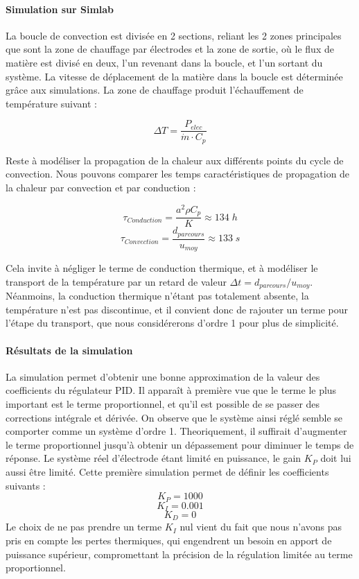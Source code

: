 \documentclass[12pt, a4paper, french, BCOR = 0pt, DIV = 10]{scrartcl}
\begin{document}
     \paragraph{Simulation sur Simlab}
     La boucle de convection est divisée en 2 sections, reliant les 2 zones principales que sont la zone de chauffage par électrodes et la zone de sortie, où le flux de matière est divisé en deux, l'un revenant dans la boucle, et l'un sortant du système. La vitesse de déplacement de la matière dans la boucle est déterminée grâce aux simulations. La zone de chauffage produit l'échauffement de température suivant :
     
     $$\Delta T = \frac{P_{elec}}{\dot{m}\cdot C_p}$$
     
     Reste à modéliser la propagation de la chaleur aux différents points du cycle de convection. Nous pouvons comparer les temps caractéristiques de propagation de la chaleur par convection et par conduction :

     $$\tau_{Conduction} = \frac{a^2\rho C_p}{K} \approx 134 \; h$$
     $$\tau_{Convection} = \frac{d_{parcours}}{u_{moy}} \approx 133 \; s$$

     Cela invite à négliger le terme de conduction thermique, et à modéliser le transport de la température par un retard de valeur $\Delta t=d_{parcours}/u_{moy}$. Néanmoins, la conduction thermique n'étant pas totalement absente, la température n'est pas discontinue, et il convient donc de rajouter un terme pour l'étape du transport, que nous considérerons d'ordre 1 pour plus de simplicité.\\

     \paragraph{Résultats de la simulation}
     La simulation permet d'obtenir une bonne approximation de la valeur des coefficients du régulateur PID. Il apparaît à première vue que le terme le plus important est le terme proportionnel, et qu'il est possible de se passer des corrections intégrale et dérivée. On observe que le système ainsi réglé semble se comporter comme un système d'ordre 1. Theoriquement, il suffirait d'augmenter le terme proportionnel jusqu'à obtenir un dépassement pour diminuer le temps de réponse. Le système réel d'électrode étant limité en puissance, le gain $K_P$ doit lui aussi être limité.     
     Cette première simulation permet de définir les coefficients suivants :
     $$K_P=1000$$
     $$K_I=0.001$$
     $$K_D=0$$
     Le choix de ne pas prendre un terme $K_I$ nul vient du fait que nous n'avons pas pris en compte les pertes thermiques, qui engendrent un besoin en apport de puissance supérieur, compromettant la précision de la régulation limitée au terme proportionnel.
\end{document}
